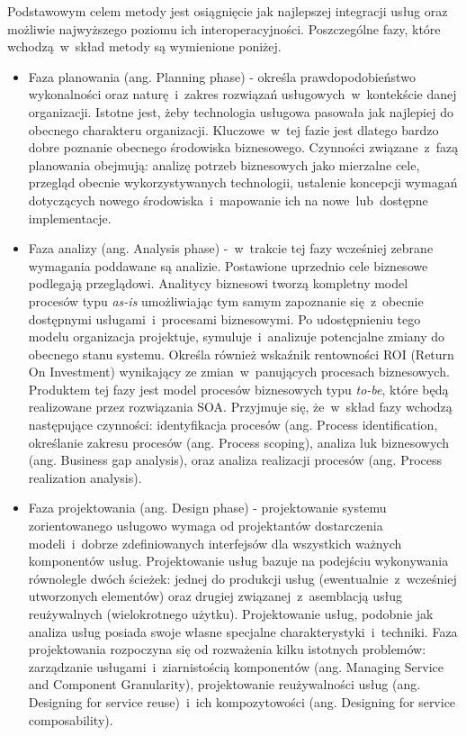 Podstawowym celem metody jest osiągnięcie jak najlepszej integracji usług oraz możliwie najwyższego poziomu ich interoperacyjności. Poszczególne fazy, które wchodzą~w~skład metody są wymienione poniżej.
\begin{itemize}
\item{Faza planowania (ang. Planning phase) - określa prawdopodobieństwo wykonalności oraz  naturę~i~zakres rozwiązań usługowych~w~kontekście danej organizacji.  Istotne jest, żeby technologia usługowa pasowała jak najlepiej do obecnego charakteru organizacji. Kluczowe~w~tej fazie jest dlatego bardzo dobre poznanie obecnego środowiska biznesowego. Czynności związane~z~fazą planowania obejmują: analizę potrzeb biznesowych jako mierzalne cele,  przegląd obecnie wykorzystywanych technologii, ustalenie koncepcji wymagań dotyczących nowego środowiska~i~mapowanie ich na nowe~lub~dostępne implementacje.}

\item{Faza analizy (ang. Analysis phase) -~w~trakcie tej fazy wcześniej zebrane wymagania poddawane są analizie. Postawione uprzednio cele biznesowe podlegają przeglądowi. Analitycy biznesowi tworzą kompletny model procesów typu \emph{as-is} umożliwiając tym samym zapoznanie się~z~obecnie dostępnymi usługami~i~procesami biznesowymi. Po udostępnieniu tego modelu organizacja projektuje, symuluje~i~analizuje potencjalne zmiany do obecnego stanu systemu. Określa również wskaźnik rentowności ROI (Return On Investment) wynikający ze zmian~w~panujących procesach biznesowych. Produktem tej fazy jest model procesów biznesowych typu \emph{to-be}, które będą realizowane przez rozwiązania SOA. Przyjmuje się, że~w~skład fazy wchodzą następujące czynności: identyfikacja procesów (ang. Process identification, określanie zakresu procesów (ang. Process scoping), analiza luk biznesowych (ang. Business gap analysis), oraz analiza realizacji procesów (ang. Process realization analysis).}

\item{Faza projektowania (ang. Design phase) - projektowanie systemu zorientowanego usługowo wymaga od projektantów dostarczenia modeli~i~dobrze zdefiniowanych interfejsów dla wszystkich ważnych komponentów usług. Projektowanie usług bazuje na podejściu wykonywania równolegle dwóch ścieżek: jednej do produkcji usług (ewentualnie~z~wcześniej utworzonych elementów) oraz drugiej związanej~z~asemblacją usług reużywalnych (wielokrotnego użytku). Projektowanie usług, podobnie jak analiza usług posiada swoje własne specjalne charakterystyki~i~techniki. Faza projektowania rozpoczyna się od rozważenia kilku istotnych problemów: zarządzanie usługami~i~ziarnistością komponentów (ang. Managing Service and Component Granularity), projektowanie reużywalności usług (ang. Designing for service reuse)~i~ich kompozytowości (ang. Designing for service composability).}


\end{itemize}
